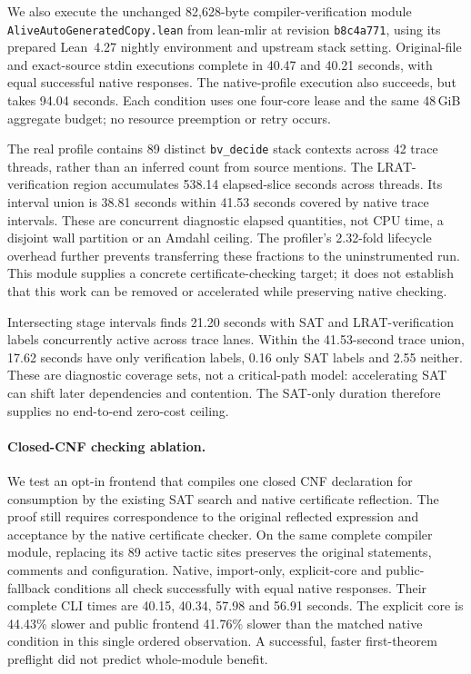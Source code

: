 \documentclass[10pt,twocolumn]{article}
\begin{document}
We also execute the unchanged 82,628-byte compiler-verification module
\texttt{AliveAutoGeneratedCopy.lean} from lean-mlir at revision
\texttt{b8c4a771}, using its prepared Lean~4.27 nightly environment and
upstream stack setting. Original-file and exact-source stdin executions
complete in 40.47 and 40.21 seconds, with equal successful native responses.
The native-profile execution also succeeds, but takes 94.04 seconds.
Each condition uses one four-core lease and the same 48\,GiB aggregate
budget; no resource preemption or retry occurs.

The real profile contains 89 distinct \texttt{bv\_decide} stack contexts
across 42 trace threads, rather than an inferred count from source mentions.
The LRAT-verification region accumulates 538.14 elapsed-slice seconds across
threads. Its interval union is 38.81 seconds within 41.53 seconds covered by
native trace intervals. These are concurrent diagnostic elapsed quantities,
not CPU time, a disjoint wall partition or an Amdahl ceiling. The profiler's
2.32-fold lifecycle overhead further prevents transferring these fractions
to the uninstrumented run. This module supplies a concrete certificate-checking
target; it does not establish that this work can be removed or accelerated
while preserving native checking.

Intersecting stage intervals finds 21.20 seconds with SAT and LRAT-verification
labels concurrently active across trace lanes. Within the 41.53-second trace
union, 17.62 seconds have only verification labels, 0.16 only SAT labels and
2.55 neither. These are diagnostic coverage sets, not a critical-path model:
accelerating SAT can shift later dependencies and contention. The SAT-only
duration therefore supplies no end-to-end zero-cost ceiling.

\paragraph{Closed-CNF checking ablation.}
We test an opt-in frontend that compiles one closed CNF declaration for
consumption by the existing SAT search and native certificate reflection.
The proof still requires correspondence to the original reflected expression
and acceptance by the native certificate checker. On the same complete
compiler module, replacing its 89 active tactic sites preserves the original
statements, comments and configuration. Native, import-only, explicit-core
and public-fallback conditions all check successfully with equal native
responses. Their complete CLI times are 40.15, 40.34, 57.98 and 56.91 seconds.
The explicit core is 44.43\% slower and public frontend 41.76\% slower than
the matched native condition in this single ordered observation.
A successful, faster first-theorem preflight did not predict whole-module benefit.
\end{document}

